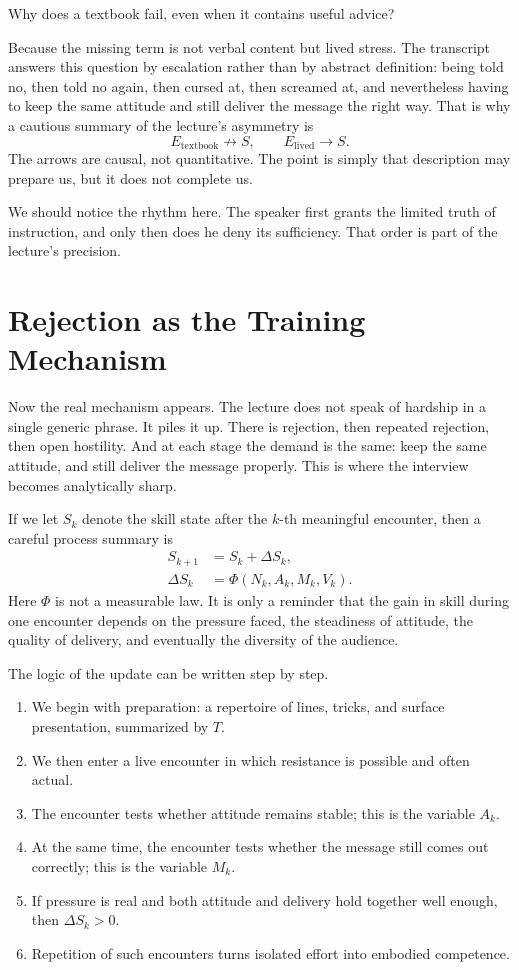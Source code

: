 Why does a textbook fail, even when it contains useful advice?

Because the missing term is not verbal content but lived stress. The transcript answers this question by escalation rather than by abstract definition: being told no, then told no again, then cursed at, then screamed at, and nevertheless having to keep the same attitude and still deliver the message the right way. That is why a cautious summary of the lecture's asymmetry is
\begin{equation}
E_{\mathrm{textbook}} \not\to S,
\qquad
E_{\mathrm{lived}} \to S.
\end{equation}
The arrows are causal, not quantitative. The point is simply that description may prepare us, but it does not complete us.

We should notice the rhythm here. The speaker first grants the limited truth of instruction, and only then does he deny its sufficiency. That order is part of the lecture's precision.

\section{Rejection as the Training Mechanism}

Now the real mechanism appears. The lecture does not speak of hardship in a single generic phrase. It piles it up. There is rejection, then repeated rejection, then open hostility. And at each stage the demand is the same: keep the same attitude, and still deliver the message properly. This is where the interview becomes analytically sharp.

If we let \(S_k\) denote the skill state after the \(k\)-th meaningful encounter, then a careful process summary is
\begin{align}
S_{k+1} &= S_k + \Delta S_k, \\
\Delta S_k &= \Phi(N_k,A_k,M_k,V_k).
\end{align}
Here \(\Phi\) is not a measurable law. It is only a reminder that the gain in skill during one encounter depends on the pressure faced, the steadiness of attitude, the quality of delivery, and eventually the diversity of the audience.

The logic of the update can be written step by step.
\begin{enumerate}
\item We begin with preparation: a repertoire of lines, tricks, and surface presentation, summarized by \(T\).
\item We then enter a live encounter in which resistance is possible and often actual.
\item The encounter tests whether attitude remains stable; this is the variable \(A_k\).
\item At the same time, the encounter tests whether the message still comes out correctly; this is the variable \(M_k\).
\item If pressure is real and both attitude and delivery hold together well enough, then \(\Delta S_k>0\).
\item Repetition of such encounters turns isolated effort into embodied competence.
\end{enumerate}

